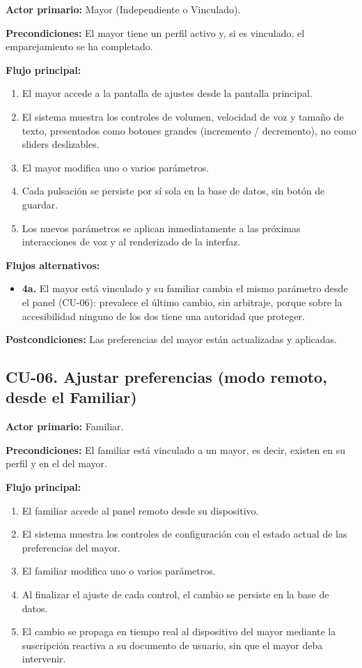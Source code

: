\noindent\textbf{Actor primario:} Mayor (Independiente o Vinculado).

\noindent\textbf{Precondiciones:} El mayor tiene un perfil activo y, si es vinculado, el emparejamiento se
ha completado.

\noindent\textbf{Flujo principal:}
\begin{enumerate}[nosep]
    \item El mayor accede a la pantalla de ajustes desde la pantalla principal.
    \item El sistema muestra los controles de volumen, velocidad de voz y tamaño de texto, presentados
    como botones grandes (incremento / decremento), no como sliders deslizables.
    \item El mayor modifica uno o varios parámetros.
    \item Cada pulsación se persiste por sí sola en la base de datos, sin botón de guardar.
    \item Los nuevos parámetros se aplican inmediatamente a las próximas interacciones de voz y al
    renderizado de la interfaz.
\end{enumerate}

\noindent\textbf{Flujos alternativos:}
\begin{itemize}[nosep]
    \item \textbf{4a.} El mayor está vinculado y su familiar cambia el mismo parámetro desde el panel
    (CU-06): prevalece el último cambio, sin arbitraje, porque sobre la accesibilidad ninguno de los dos
    tiene una autoridad que proteger.
\end{itemize}

\noindent\textbf{Postcondiciones:} Las preferencias del mayor están actualizadas y aplicadas.

\bigskip

\subsection*{CU-06. Ajustar preferencias (modo remoto, desde el Familiar)}

\noindent\textbf{Actor primario:} Familiar.

\noindent\textbf{Precondiciones:} El familiar está vinculado a un mayor, es decir, existen
 en su perfil y  en el del mayor.

\noindent\textbf{Flujo principal:}
\begin{enumerate}[nosep]
    \item El familiar accede al panel remoto desde su dispositivo.
    \item El sistema muestra los controles de configuración con el estado actual de las preferencias del
    mayor.
    \item El familiar modifica uno o varios parámetros.
    \item Al finalizar el ajuste de cada control, el cambio se persiste en la base de datos.
    \item El cambio se propaga en tiempo real al dispositivo del mayor mediante la suscripción reactiva a
    su documento de usuario, sin que el mayor deba intervenir.
\end{enumerate}

